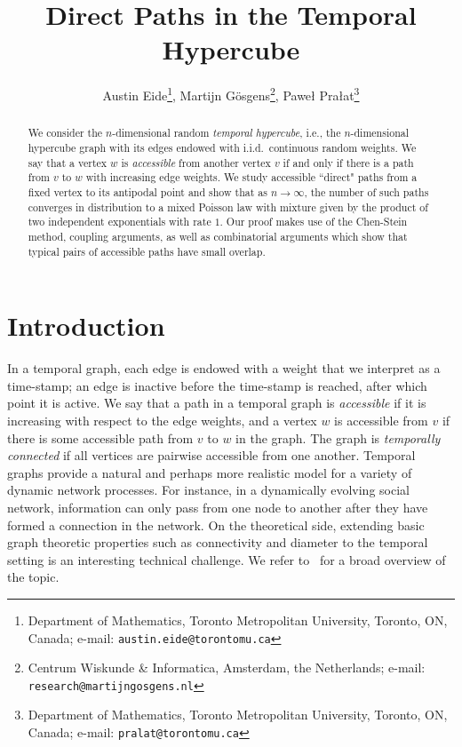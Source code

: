 \documentclass[11pt]{article}
\title{Direct Paths in the Temporal Hypercube}
\author{
Austin Eide\footnote{Department of Mathematics, Toronto Metropolitan University, Toronto, ON, Canada; e-mail: \texttt{austin.eide@torontomu.ca}}, 
Martijn Gösgens\footnote{Centrum Wiskunde \& Informatica, Amsterdam, the Netherlands; e-mail: \texttt{research@martijngosgens.nl}},
Pawe\l{} Pra\l{}at\footnote{Department of Mathematics, Toronto Metropolitan University, Toronto, ON, Canada; e-mail: \texttt{pralat@torontomu.ca}}
}
\theoremstyle{definition}
\theoremstyle{remark}
\theoremstyle{remark}
\numberwithin{theorem}{section}
\begin{document}
\maketitle

\begin{abstract}
We consider the $n$-dimensional random \textit{temporal hypercube}, i.e., the $n$-dimensional hypercube graph with its edges endowed with i.i.d.\ continuous random weights. We say that a vertex $w$ is \emph{accessible} from another vertex $v$ if and only if there is a path from $v$ to $w$ with increasing edge weights. We study accessible ``direct" paths from a fixed vertex to its antipodal point and show that as $n \to \infty$, the number of such paths converges in distribution to a mixed Poisson law with mixture given by the product of two independent exponentials with rate $1$. Our proof makes use of the Chen-Stein method, coupling arguments, as well as combinatorial arguments which show that typical pairs of accessible paths have small overlap.
\end{abstract}


\section{Introduction}

In a temporal graph, each edge is endowed with a weight that we interpret as a time-stamp; an edge is inactive before the time-stamp is reached, after which point it is active. We say that a path in a temporal graph is \textit{accessible} if it is increasing with respect to the edge weights, and a vertex $w$ is accessible from $v$ if there is some accessible path from $v$ to $w$ in the graph. The graph is \textit{temporally connected} if all vertices are pairwise accessible from one another. Temporal graphs provide a natural and perhaps more realistic model for a variety of dynamic network processes. For instance, in a dynamically evolving social network, information can only pass from one node to another after they have formed a connection in the network. On the theoretical side, extending basic graph theoretic properties such as connectivity and diameter to the temporal setting is an interesting technical challenge. We refer to~\cite{michail2016introduction} for a broad overview of the topic.
\end{document}
